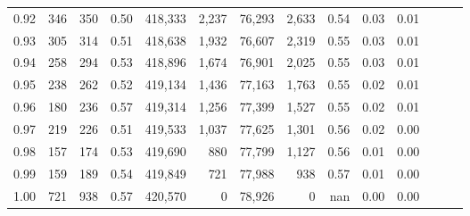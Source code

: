 \begin{tabular}{rrrrrrrrrrrrrr}
0.92 &    346 &    350 &  0.50 &  418,333 &    2,237 &  76,293 &   2,633 &  0.54 &  0.03 &      0.01 \\
0.93 &    305 &    314 &  0.51 &  418,638 &    1,932 &  76,607 &   2,319 &  0.55 &  0.03 &      0.01 \\
0.94 &    258 &    294 &  0.53 &  418,896 &    1,674 &  76,901 &   2,025 &  0.55 &  0.03 &      0.01 \\
0.95 &    238 &    262 &  0.52 &  419,134 &    1,436 &  77,163 &   1,763 &  0.55 &  0.02 &      0.01 \\
0.96 &    180 &    236 &  0.57 &  419,314 &    1,256 &  77,399 &   1,527 &  0.55 &  0.02 &      0.01 \\
0.97 &    219 &    226 &  0.51 &  419,533 &    1,037 &  77,625 &   1,301 &  0.56 &  0.02 &      0.00 \\
0.98 &    157 &    174 &  0.53 &  419,690 &      880 &  77,799 &   1,127 &  0.56 &  0.01 &      0.00 \\
0.99 &    159 &    189 &  0.54 &  419,849 &      721 &  77,988 &     938 &  0.57 &  0.01 &      0.00 \\
1.00 &    721 &    938 &  0.57 &  420,570 &        0 &  78,926 &       0 &   nan &  0.00 &      0.00 \\
\bottomrule
\end{tabular}
